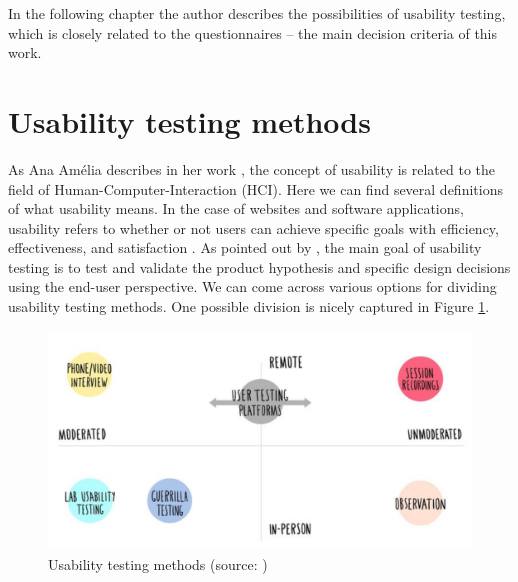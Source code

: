 \documentclass[a4paper,10pt,twoside]{article}
\begin{document}
\noindent In the following chapter the author describes the possibilities of usability testing, which is closely related to the questionnaires -- the main decision criteria of this work.

\newpage
\vspace*{-1cm}
\section{Usability testing methods}
\label{sec:usability_testing}

\noindent As Ana Amélia describes in her work \cite{amelia}, the
concept of usability is related to the field of
Human-Computer-Interaction (HCI). Here we can find several definitions
of what usability means. In the case of websites and software
applications, usability refers to whether or not users can achieve
specific goals with efficiency, effectiveness, and satisfaction
\cite{dishman}. As pointed out by \cite{hotjar}, the main goal of
usability testing is to test and validate the product hypothesis and
specific design decisions using the end-user perspective. We can come
across various options for dividing usability testing methods. One
possible division is nicely captured in Figure
\ref{fig:usability_testing_methods}.

\vspace{0.3cm}
\begin{figure}[hbt!] 
\begin{center}
\includegraphics[width=15cm]{../pictures/usability_testing_methods.png} 
\caption[Usability testing methods]{Usability testing methods (source: \cite{hotjar})}
\label{fig:usability_testing_methods}
\end{center}
\end{figure}
\end{document}
